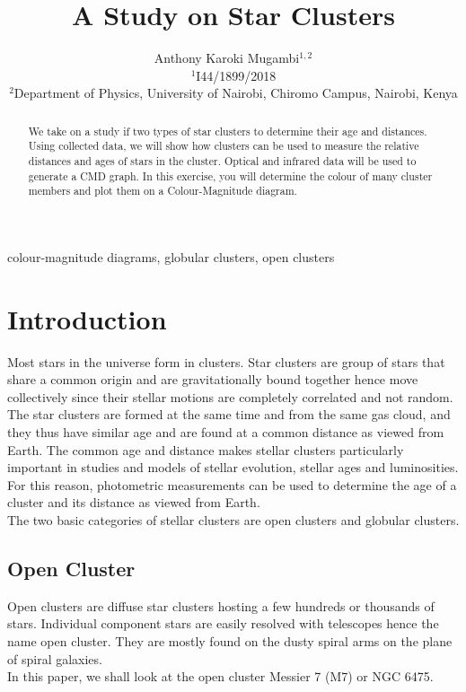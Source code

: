 \documentclass[12pt]{article}
\title{A Study on Star Clusters}
\author{Anthony Karoki Mugambi$^{1, 2}$\\
	\small $^1$I44/1899/2018\\
	\small $^2$Department of Physics, University of Nairobi, Chiromo Campus, Nairobi, Kenya
}
\date{}
\providecommand{\keywords}[1]
{
	\small	
	\textbf{\text{Keywords: }} #1
}
\begin{document}
	\maketitle
	
	\begin{abstract}
		We take on a study if two types of star clusters to determine their age and distances. Using collected data, we will show how clusters can be used to measure the relative distances and ages of stars in the cluster. Optical and infrared data will be used to generate a CMD graph. In this exercise, you will determine the colour of many cluster members and plot them on a Colour-Magnitude diagram.%
	\end{abstract}

	\keywords{colour-magnitude diagrams, globular clusters, open clusters}
	
	\pagebreak
	\tableofcontents
	
	\pagebreak
	\listoffigures

	\pagebreak
	\section{Introduction}
	\label{sec:intro}
	Most stars in the universe form in clusters. Star clusters are group of stars that share a common origin and are gravitationally bound together hence move collectively since their stellar motions are completely correlated and not random. The star clusters are formed at the same time and from the same gas cloud, and they thus have similar age and are found at a common distance as viewed from Earth. The common age and distance makes stellar clusters particularly important in studies and models of stellar evolution, stellar ages and luminosities. For this reason, photometric measurements can be used to determine the age of a cluster and its distance as viewed from Earth.\\
	The two basic categories of stellar clusters are open clusters and globular clusters.\\
		\subsection{Open Cluster}
		Open clusters are diffuse star clusters hosting a few hundreds or thousands of stars. Individual component stars are easily resolved with telescopes hence the name open cluster. They are mostly found on the dusty spiral arms on the plane of spiral galaxies.\\
		In this paper, we shall look at the open cluster Messier 7 (M7) or NGC 6475.
\end{document}
